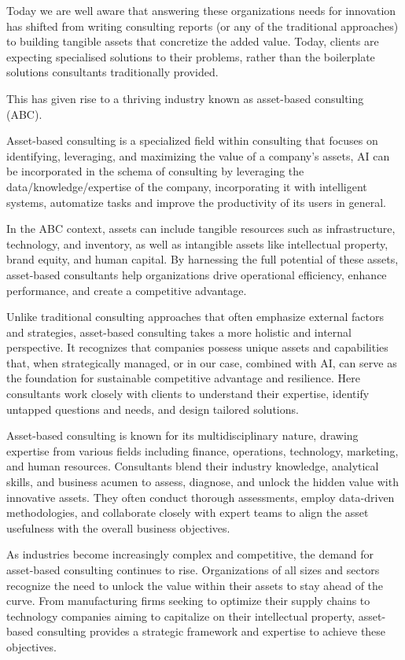 \documentclass[a4paper,12pt]{article}
\begin{document}
Today we are well aware that answering these organizations needs for innovation has shifted from writing consulting reports (or any of the traditional approaches) to building tangible assets that concretize the added value. Today, clients are expecting specialised solutions to their problems, rather than the boilerplate solutions consultants traditionally provided.

This has given rise to a thriving industry known as asset-based consulting (ABC).

Asset-based consulting is a specialized field within consulting that focuses on identifying, leveraging, and maximizing the value of a company's assets, AI can be incorporated in the schema of consulting by leveraging the data/knowledge/expertise of the company, incorporating it with intelligent systems, automatize tasks and improve the productivity of its users in general. 

In the ABC context, assets can include tangible resources such as infrastructure, technology, and inventory, as well as intangible assets like intellectual property, brand equity, and human capital. By harnessing the full potential of these assets, asset-based consultants help organizations drive operational efficiency, enhance performance, and create a competitive advantage.

Unlike traditional consulting approaches that often emphasize external factors and strategies, asset-based consulting takes a more holistic and internal perspective. It recognizes that companies possess unique assets and capabilities that, when strategically managed, or in our case, combined with AI, can serve as the foundation for sustainable competitive advantage and resilience. Here consultants work closely with clients to understand their expertise, identify untapped questions and needs, and design tailored solutions.

Asset-based consulting is known for its multidisciplinary nature, drawing expertise from various fields including finance, operations, technology, marketing, and human resources. Consultants blend their industry knowledge, analytical skills, and business acumen to assess, diagnose, and unlock the hidden value with innovative assets. They often conduct thorough assessments, employ data-driven methodologies, and collaborate closely with expert teams to align the asset usefulness with the overall business objectives.

As industries become increasingly complex and competitive, the demand for asset-based consulting continues to rise. Organizations of all sizes and sectors recognize the need to unlock the value within their assets to stay ahead of the curve. From manufacturing firms seeking to optimize their supply chains to technology companies aiming to capitalize on their intellectual property, asset-based consulting provides a strategic framework and expertise to achieve these objectives.
\end{document}
